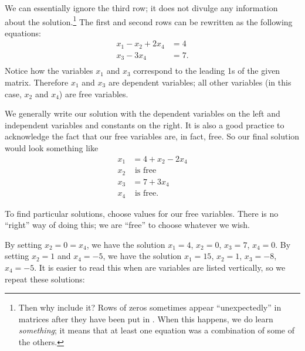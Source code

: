 {We can essentially ignore the third row; it does not divulge any information about the solution.\footnote{Then why include it? Rows of zeros sometimes appear ``unexpectedly'' in matrices after they have been put in \rref. When this happens, we do learn \textit{something}; it means that at least one equation was a combination of some of the others.} 
 The first and second rows can be rewritten as the following equations: \begin{align*} x_1 - x_2 + 2x_4 &=4 \\ x_3 - 3x_4 &= 7. \\ \end{align*} Notice how the variables $x_1$ and $x_3$ correspond to the leading 1s of the given matrix. Therefore $x_1$ and $x_3$ are dependent variables; all other variables (in this case, $x_2$ and $x_4$) are free variables.

We generally write our solution with the dependent variables on the left and independent variables and constants on the right. It is also a good practice to acknowledge the fact that our free variables are, in fact, free. So our final solution would look something like \begin{align*} x_1 &= 4 +x_2 - 2x_4 \\ x_2 & \text{ is free} \\ x_3 &= 7+3x_4 \\ x_4 & \text{ is free}.\end{align*}

To find particular solutions, choose values for our free variables. There is no ``right'' way of doing this; we are ``free'' to choose whatever we wish. 


By setting $x_2 = 0 = x_4$, we have the solution $x_1 = 4$, $x_2 = 0$, $x_3 = 7$, $x_4 = 0$. By setting $x_2 = 1$ and $x_4 = -5$, we have the solution $x_1 = 15$, $x_2 = 1$, $x_3 = -8$, $x_4 = -5$. It is easier to read this when are variables are listed vertically, so we repeat these solutions:

}

